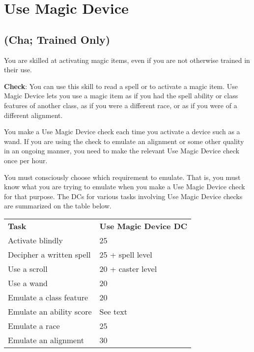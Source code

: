 \section{Use Magic Device}

\label{f0}				
\subsection{(Cha; Trained Only)}

				
You are skilled at activating magic items, even if you are not otherwise trained in their use.
				
\textbf{Check}: You can use this skill to read a spell or to activate a magic item. Use Magic Device lets you use a magic item as if you had the spell ability or class features of another class, as if you were a different race, or as if you were of a different alignment.
				
You make a Use Magic Device check each time you activate a device such as a wand. If you are using the check to emulate an alignment or some other quality in an ongoing manner, you need to make the relevant Use Magic Device check once per hour.
				
You must consciously choose which requirement to emulate. That is, you must know what you are trying to emulate when you make a Use Magic Device check for that purpose. The DCs for various tasks involving Use Magic Device checks are summarized on the table below.
\begin{table}
 \sffamily
 \begin{tabular}{ll}
\textbf{Task} & \textbf{Use Magic Device DC}\\
Activate blindly & 25\\
Decipher a written spell & 25 + spell level\\
Use a scroll & 20 + caster level\\
Use a wand & 20\\
Emulate a class feature & 20\\
Emulate an ability score & See text\\
Emulate a race & 25\\
Emulate an alignment & 30\\  
 \end{tabular}

\end{table}
			

